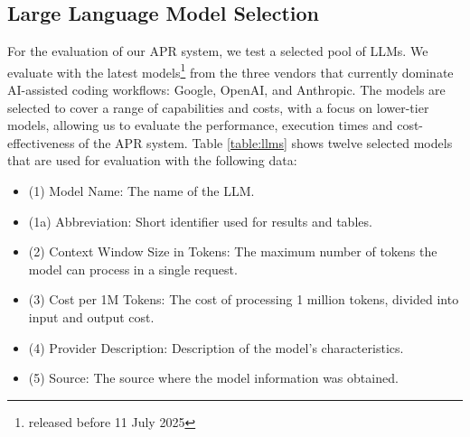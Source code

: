 \subsection{Large Language Model Selection} \label{subsection:llm-selection}
For the evaluation of our APR system, we test a selected pool of \acp{LLM}. We evaluate with the latest models\footnote{released before 11 July 2025} from the three vendors that currently dominate AI-assisted coding workflows: Google, OpenAI, and Anthropic. \cite{Technology2025Stack}
The models are selected to cover a range of capabilities and costs, with a focus on lower-tier models, allowing us to evaluate the performance, execution times and cost-effectiveness of the APR system. Table \ref{table:llms} shows twelve selected models that are used for evaluation with the following data:
\begin{itemize}
    \item (1) Model Name: The name of the \ac{LLM}.
    \item (1a) Abbreviation: Short identifier used for results and tables.
    \item (2) Context Window Size in Tokens: The maximum number of tokens the model can process in a single request.
    \item (3) Cost per 1M Tokens: The cost of processing 1 million tokens, divided into input and output cost.
    \item (4) Provider Description: Description of the model's characteristics.
    \item (5) Source: The source where the model information was obtained.
\end{itemize}

